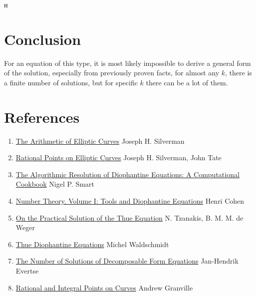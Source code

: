 н\documentclass[a4paper,14pt]{extarticle}  %
\begin{document}
\section{Conclusion}
For an equation of this type, it is most likely impossible to derive a general form of the solution, especially from previously proven facts, for almost any $k$, there is a finite number of solutions, but for specific $k$ there can be a lot of them.
\section{References}
\begin{enumerate}
    \item \href{https://link.springer.com/book/10.1007/978-1-4757-1920-8}{The Arithmetic of Elliptic Curves} Joseph H. Silverman

    \item \href{https://link.springer.com/book/10.1007/978-1-4757-4252-7}{Rational Points on Elliptic Curves} Joseph H. Silverman, John Tate

    \item \href{https://www.cambridge.org/core/books/algorithmic-resolution-of-diophantine-equations/8140C8D3E91A8C933D21976163F3D905}{The Algorithmic Resolution of Diophantine Equations: A Computational Cookbook} Nigel P. Smart

    \item \href{https://link.springer.com/series/7604}{Number Theory. Volume I: Tools and Diophantine Equations} Henri Cohen

    \item \href{https://www.sciencedirect.com/science/article/pii/0022314X89900140}{On the Practical Solution of the Thue Equation} N. Tzanakis, B. M. M. de Weger

    \item \href{https://webusers.imj-prg.fr/~michel.waldschmidt/articles/pdf/ProcHRI2017ThueEquations.pdf}{Thue Diophantine Equations} Michel Waldschmidt

    \item \href{https://eudml.org/doc/144332}{The Number of Solutions of Decomposable Form Equations} Jan-Hendrik Evertse

    \item \href{https://dms.umontreal.ca/~andrew/Courses/RationalPtsOnCurves.pdf}{Rational and Integral Points on Curves} Andrew Granville
\end{enumerate}
\end{document}

